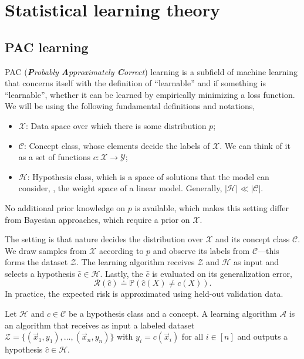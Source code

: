 \section{Statistical learning theory}

\subsection{PAC learning}

PAC (\textit{\textbf{P}robably \textbf{A}pproximately \textbf{C}orrect}) learning is a subfield of
machine learning that concerns itself with the definition of ``learnable'' and if something is
``learnable'', whether it can be learned by empirically minimizing a loss function. We will be
using the following fundamental definitions and notations,
\begin{itemize}
    \item $\mathcal{X}$: Data space over which there is some distribution $p$;
    \item $\mathcal{C}$: Concept class, whose elements decide the labels of $\mathcal{X}$. We can
          think of it as a set of functions $c: \mathcal{X} \to \mathcal{Y}$;
    \item $\mathcal{H}$: Hypothesis class, which is a space of solutions that the model can consider,
          \eg, the weight space of a linear model. Generally, $|\mathcal{H}| \ll |\mathcal{C}|$.
\end{itemize}
No additional prior knowledge on $p$ is available, which makes this setting differ from Bayesian
approaches, which require a prior on $\mathcal{X}$.

The setting is that nature decides the distribution over $\mathcal{X}$ and its concept class
$\mathcal{C}$. We draw samples from $\mathcal{X}$ according to $p$ and observe its labels from
$\mathcal{C}$---this forms the dataset $\mathcal{Z}$. The learning algorithm receives $\mathcal{Z}$
and $\mathcal{H}$ as input and selects a hypothesis $\hat{c} \in \mathcal{H}$. Lastly, the
$\hat{c}$ is evaluated on its generalization error, \[
    \mathcal{R}(\hat{c}) \doteq \mathbb{P}(\hat{c}(X) \neq c(X)).
\]
In practice, the expected risk is approximated using held-out validation data.

\begin{definition}
    Let $\mathcal{H}$ and $c \in \mathcal{C}$ be a hypothesis class and a concept. A learning algorithm $\mathcal{A}$
    is an algorithm that receives as input a labeled dataset $\mathcal{Z} = \{ (\vec{x}_1, y_1),
        \ldots, (\vec{x}_n,y_n) \}$ with $y_i = c(\vec{x}_i)$ for all $i \in [n]$ and outputs a
    hypothesis $\hat{c} \in \mathcal{H}$.
\end{definition}

